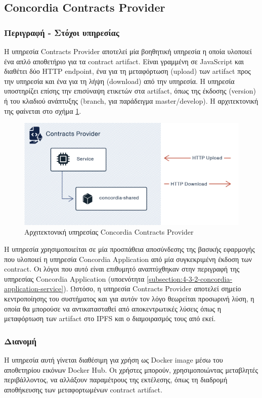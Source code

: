 \subsection{Concordia Contracts Provider} \label{subsection:4-3-5-concordia-contracts-provider-service}

\subsubsection{Περιγραφή - Στόχοι υπηρεσίας}

Η υπηρεσία Contracts Provider αποτελεί μία βοηθητική υπηρεσία η οποία υλοποιεί ένα απλό αποθετήριο για τα \textenglish{contract artifact}. Είναι γραμμένη σε JavaScript και διαθέτει δύο HTTP \textenglish{endpoint}, ένα για τη μεταφόρτωση (upload) των artifact προς την υπηρεσία και ένα για τη λήψη (download) από την υπηρεσία. Η υπηρεσία υποστηρίζει επίσης την επισύναψη ετικετών στα artifact, όπως της έκδοσης (version) ή του κλαδιού ανάπτυξης (branch, για παράδειγμα \textenglish{master/develop}). Η αρχιτεκτονική της φαίνεται στο σχήμα \ref{figure:4-3-concordia-contracts-provider-architecture}.

\vspace{.5\baselineskip}

\begin{figure}[H]
    \centering
    \includegraphics[width=.75\textwidth]{assets/figures/chapter-4/4.3.architecture-4.3.5.concordia-contracts-provider-architecture}
    \caption{Αρχιτεκτονική υπηρεσίας Concordia Contracts Provider}
    \label{figure:4-3-concordia-contracts-provider-architecture}
\end{figure}

Η υπηρεσία χρησιμοποιείται σε μία προσπάθεια αποσύνδεσης της βασικής εφαρμογής που υλοποιεί η υπηρεσία Concordia Application από μία συγκεκριμένη έκδοση των contract. Οι λόγοι που αυτό είναι επιθυμητό αναπτύχθηκαν στην περιγραφή της υπηρεσίας Concordia \textenglish{Application} (υποενότητα \ref{subsection:4-3-2-concordia-application-service}). Ωστόσο, η υπηρεσία Contracts Provider αποτελεί σημείο κεντροποίησης του συστήματος και για αυτόν τον λόγο θεωρείται προσωρινή λύση, η οποία θα μπορούσε να αντικατασταθεί από αποκεντρωτικές λύσεις όπως η μεταφόρτωση των artifact στο IPFS και ο διαμοιρασμός τους από εκεί.

\subsubsection{Διανομή}

Η υπηρεσία αυτή γίνεται διαθέσιμη για χρήση ως Docker image μέσω του αποθετηρίου εικόνων Docker Hub. Οι χρήστες μπορούν, χρησιμοποιώντας μεταβλητές περιβάλλοντος, να αλλάξουν παραμέτρους της εκτέλεσης, όπως τη διαδρομή αποθήκευσης των μεταφορτωμένων \textenglish{contract artifact}.